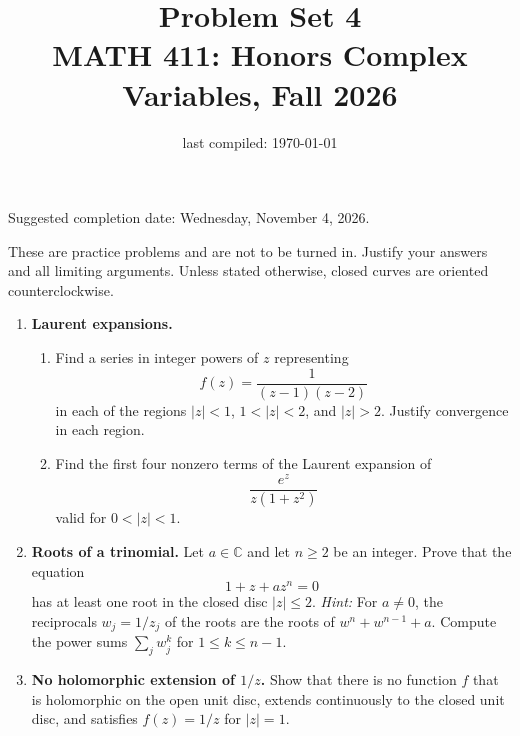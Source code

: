\documentclass[12pt,reqno]{amsart}
\title{Problem Set 4 \\ MATH 411: Honors Complex Variables, Fall 2026}
\date{last compiled: \today}
\newcommand{\C}{\mathbb{C}}
\begin{document}
\maketitle

\begin{center}
Suggested completion date: Wednesday, November 4, 2026.
\end{center}

These are practice problems and are not to be turned in. Justify your
answers and all limiting arguments. Unless stated otherwise, closed
curves are oriented counterclockwise.

\begin{enumerate}

\item \textbf{Laurent expansions.}
\begin{enumerate}
\item Find a series in integer powers of $z$ representing
\[
 f(z)=\frac{1}{(z-1)(z-2)}
\]
in each of the regions $|z|<1$, $1<|z|<2$, and $|z|>2$.
Justify convergence in each region.
\item Find the first four nonzero terms of the Laurent expansion of
\[
 \frac{e^z}{z(1+z^2)}
\]
valid for $0<|z|<1$.
\end{enumerate}

\item \textbf{Roots of a trinomial.}
Let $a\in\C$ and let $n\geq2$ be an integer. Prove that the equation
\[
 1+z+az^n=0
\]
has at least one root in the closed disc $|z|\leq2$.
\emph{Hint:} For $a\neq0$, the reciprocals $w_j=1/z_j$ of the roots are
the roots of $w^n+w^{n-1}+a$. Compute the power sums
$\sum_j w_j^{k}$ for $1\leq k\leq n-1$.

\item \textbf{No holomorphic extension of $1/z$.}
Show that there is no function $f$ that is holomorphic on the open unit
disc, extends continuously to the closed unit disc, and satisfies
$f(z)=1/z$ for $|z|=1$.

\end{enumerate}
\end{document}
